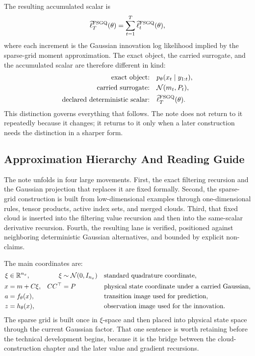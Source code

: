 \documentclass[11pt]{article}
\numberwithin{equation}{section}
\newcommand{\R}{\mathbb R}
\newcommand{\N}{\mathcal N}
\newcommand{\ellhat}{\widehat\ell}
\begin{document}
The resulting accumulated scalar is
\begin{equation}
  \ellhat_T^{\rm FSGQ}(\theta)
  =
  \sum_{t=1}^T \ellhat_t^{\rm FSGQ}(\theta),
  \label{eq:p32-one-page-scalar}
\end{equation}
where each increment is the Gaussian innovation log likelihood implied by the
sparse-grid moment approximation.  The exact object, the carried surrogate, and
the accumulated scalar are therefore different in kind:
\begin{equation}
\begin{aligned}
  \text{exact object:}
  &\quad p_\theta(x_t\mid y_{1:t}), \\
  \text{carried surrogate:}
  &\quad \N(m_t,P_t), \\
  \text{declared deterministic scalar:}
  &\quad \ellhat_T^{\rm FSGQ}(\theta).
\end{aligned}
  \label{eq:p32-exact-vs-approximate-summary}
\end{equation}
This distinction governs everything that follows.  The note does not return to it
repeatedly because it changes; it returns to it only when a later construction
needs the distinction in a sharper form.

\subsection{Approximation Hierarchy And Reading Guide}
\label{sec:p32-hierarchy}

The note unfolds in four large movements.  First, the exact filtering recursion
and the Gaussian projection that replaces it are fixed formally.  Second, the
sparse-grid construction is built from low-dimensional examples through
one-dimensional rules, tensor products, active index sets, and merged clouds.
Third, that fixed cloud is inserted into the filtering value recursion and then
into the same-scalar derivative recursion.  Fourth, the resulting lane is
verified, positioned against neighboring deterministic Gaussian alternatives, and
bounded by explicit non-claims.

The main coordinates are:
\begin{align}
  \xi &\in \R^{n_x},
  &\xi&\sim\N(0,I_{n_x})
  &&\hbox{standard quadrature coordinate},
  \label{eq:p32-standard-coordinate}\\
  x &= m+C\xi,
  &CC^\top&=P
  &&\hbox{physical state coordinate under a carried Gaussian},
  \label{eq:p32-physical-coordinate}\\
  a &= f_\theta(x),
  &&
  &&\hbox{transition image used for prediction},
  \label{eq:p32-transition-coordinate}\\
  z &= h_\theta(x),
  &&
  &&\hbox{observation image used for the innovation}.
  \label{eq:p32-observation-coordinate}
\end{align}
The sparse grid is built once in \(\xi\)-space and then placed into physical
state space through the current Gaussian factor.  That one sentence is worth
retaining before the technical development begins, because it is the bridge
between the cloud-construction chapter and the later value and gradient recursions.
\end{document}
